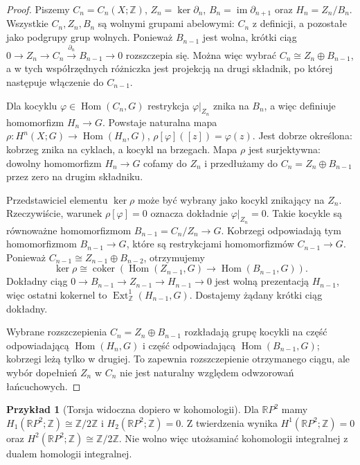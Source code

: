 \documentclass[11pt,a4paper,oneside]{report}
\newcommand{\R}{\mathbb{R}}
\newcommand{\Z}{\mathbb{Z}}
\theoremstyle{plain}
\theoremstyle{definition}
\newtheorem{przyklad}[twierdzenie]{Przykład}
\theoremstyle{remark}
\begin{document}
\begin{proof}
Piszemy $C_n=C_n(X;\Z)$,
$Z_n=\ker\partial_n$, $B_n=\operatorname{im}\partial_{n+1}$ oraz
$H_n=Z_n/B_n$. Wszystkie $C_n,Z_n,B_n$ są wolnymi grupami
abelowymi: $C_n$ z definicji, a pozostałe jako podgrupy
grup wolnych. Ponieważ $B_{n-1}$ jest wolna, krótki ciąg
$0\to Z_n\to C_n\xrightarrow{\partial_n}B_{n-1}\to0$
rozszczepia się. Można więc wybrać
$C_n\cong Z_n\oplus B_{n-1}$, a w tych współrzędnych
różniczka jest projekcją na drugi składnik, po której
następuje włączenie do $C_{n-1}$.

Dla kocyklu $\varphi\in\operatorname{Hom}(C_n,G)$ restrykcja
$\varphi|_{Z_n}$ znika na $B_n$, a więc definiuje
homomorfizm $H_n\to G$. Powstaje naturalna mapa
$\rho:H^n(X;G)\to\operatorname{Hom}(H_n,G)$,
$\rho[\varphi]([z])=\varphi(z)$. Jest dobrze określona:
kobrzeg znika na cyklach, a kocykl na brzegach.
Mapa $\rho$ jest surjektywna: dowolny homomorfizm
$H_n\to G$ cofamy do $Z_n$ i przedłużamy do
$C_n=Z_n\oplus B_{n-1}$ przez zero na drugim składniku.

Przedstawiciel elementu $\ker\rho$ może być wybrany
jako kocykl znikający na $Z_n$. Rzeczywiście, warunek
$\rho[\varphi]=0$ oznacza dokładnie $\varphi|_{Z_n}=0$.
Takie kocykle są równoważne homomorfizmom
$B_{n-1}=C_n/Z_n\to G$. Kobrzegi odpowiadają tym
homomorfizmom $B_{n-1}\to G$, które są restrykcjami
homomorfizmów $C_{n-1}\to G$. Ponieważ
$C_{n-1}\cong Z_{n-1}\oplus B_{n-2}$, otrzymujemy
\[
\ker\rho\cong
\operatorname{coker}\!\left(
\operatorname{Hom}(Z_{n-1},G)\longrightarrow
\operatorname{Hom}(B_{n-1},G)\right).
\]
Dokładny ciąg
$0\to B_{n-1}\to Z_{n-1}\to H_{n-1}\to0$
jest wolną prezentacją $H_{n-1}$, więc ostatni
kokernel to $\operatorname{Ext}^1_{\Z}(H_{n-1},G)$.
Dostajemy żądany krótki ciąg dokładny.

Wybrane rozszczepienia $C_n=Z_n\oplus B_{n-1}$
rozkładają grupę kocykli na część odpowiadającą
$\operatorname{Hom}(H_n,G)$ i część odpowiadającą
$\operatorname{Hom}(B_{n-1},G)$; kobrzegi leżą tylko
w drugiej. To zapewnia rozszczepienie otrzymanego
ciągu, ale wybór dopełnień $Z_n$ w $C_n$ nie jest
naturalny względem odwzorowań łańcuchowych.
\end{proof}

\begin{przyklad}[Torsja widoczna dopiero w kohomologii]
Dla $\R P^2$ mamy $H_1(\R P^2;\Z)\cong\Z/2\Z$
i $H_2(\R P^2;\Z)=0$. Z twierdzenia wynika
$H^1(\R P^2;\Z)=0$ oraz
$H^2(\R P^2;\Z)\cong\Z/2\Z$.
Nie wolno więc utożsamiać kohomologii integralnej
z dualem homologii integralnej.
\end{przyklad}
\end{document}
